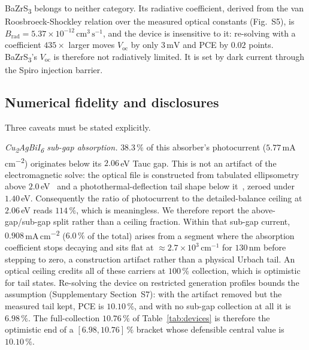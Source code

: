 \documentclass[lettersize,journal]{IEEEtran}
\newcommand{\CABI}{Cu\textsubscript{2}AgBiI\textsubscript{6}}
\newcommand{\BZS}{BaZrS\textsubscript{3}}
\newcommand{\percm}{\,mA\,cm\textsuperscript{$-$2}}
\begin{document}
\BZS{} belongs to neither category. Its radiative coefficient, derived from
the van Roosbroeck-Shockley relation over the measured optical constants
(Fig.~S5), is $B_\mathrm{rad} = 5.37\times10^{-12}\,\mathrm{cm^3\,s^{-1}}$,
and the device is insensitive to it: re-solving with a coefficient
$435\times$ larger moves $V_\mathrm{oc}$ by only $3\,\mathrm{mV}$ and PCE
by $0.02$ points. \BZS's $V_\mathrm{oc}$ is therefore not radiatively
limited. It is set by dark current through the Spiro injection barrier.

\subsection{Numerical fidelity and disclosures}
Three caveats must be stated explicitly.

\emph{\CABI{} sub-gap absorption.} $38.3\,\%$ of this absorber's photocurrent
($5.77$\percm) originates below its $2.06\,$eV Tauc gap. This is not an
artifact of the electromagnetic solve: the optical file is constructed from
tabulated ellipsometry above $2.0\,$eV~\cite{kamppinen2026} and a
photothermal-deflection tail shape below it~\cite{sansom2021}, zeroed under
$1.40\,$eV. Consequently the ratio of photocurrent to the detailed-balance
ceiling at $2.06\,$eV reads $114\,\%$, which is meaningless. We therefore
report the above-gap/sub-gap split rather than a ceiling fraction. Within that
sub-gap current, $0.908$\percm{} ($6.0\,\%$ of the total) arises from a
segment where the absorption coefficient stops decaying and sits flat at
$\approx2.7\times10^{3}\,\mathrm{cm^{-1}}$ for $130\,\mathrm{nm}$ before
stepping to zero, a construction artifact rather than a physical Urbach tail.
An optical ceiling credits all of these carriers at $100\,\%$ collection,
which is optimistic for tail states. Re-solving the device on restricted
generation profiles bounds the assumption (Supplementary Section~S7): with
the artifact removed but the measured tail kept, PCE is $10.10\,\%$, and with no
sub-gap collection at all it is $6.98\,\%$. The full-collection $10.76\,\%$ of
Table~\ref{tab:devices} is therefore the optimistic end of a $[6.98, 10.76]\,\%$ bracket
whose defensible central value is $10.10\,\%$.
\end{document}
